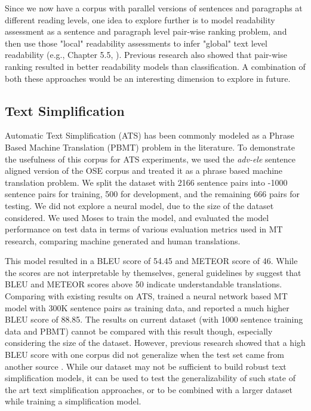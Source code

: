 \documentclass[11pt,a4paper]{article}
\begin{document}
Since we now have a corpus with parallel versions of sentences and paragraphs at different reading levels, one idea to explore further is to model readability assessment as a sentence and paragraph level pair-wise ranking problem, and then use those "local" readability assessments to infer "global" text level readability (e.g., Chapter 5.5, \citet{Vajjala-15}). Previous research also \cite{Ma.Fosler-Lussier.ea-12} showed that pair-wise ranking resulted in better readability models than classification. A combination of both these approaches would be an interesting dimension to explore in future. 

\subsection{Text Simplification}
\label{sec:ATS}
Automatic Text Simplification (ATS) has been commonly modeled as a Phrase Based Machine Translation (PBMT) problem in the literature. To demonstrate the usefulness of this corpus for ATS experiments, we used the \textit{adv-ele} sentence aligned version of the OSE corpus and treated it as a phrase based machine translation problem. We split the dataset with 2166 sentence pairs into -1000 sentence pairs for training, 500 for development, and the remaining 666 pairs for testing. We did not explore a neural model, due to the size of the dataset considered.  We used Moses \cite{Hoang.Birch.ea-07} to train the model, and evaluated the model performance on test data in terms of various evaluation metrics used in MT research, comparing machine generated and human translations. 

This model resulted in a BLEU \cite{Papineni.Roukos.ea-01} score of 54.45 and METEOR \cite{Denkowski.Lavie-14} score of 46. While the scores are not interpretable by themselves, general guidelines by \citet{Lavie-11} suggest that BLEU and METEOR scores above 50 indicate understandable translations. Comparing with existing results on ATS, \citet{Zhang.Lapata-17} trained a neural network based MT model with 300K sentence pairs as training data, and reported a much higher BLEU score of 88.85. The results on current dataset (with 1000 sentence training data and PBMT) cannot be compared with this result though, especially considering the size of the dataset. However, previous research showed that a high BLEU score with one corpus did not generalize when the test set came from another source \cite[Chapter 6 in][]{Vajjala-15}. While our dataset may not be sufficient to build robust text simplification models, it can be used to test the generalizability of such state of the art text simplification approaches, or to be combined with a larger dataset while training a simplification model. 
\end{document}
